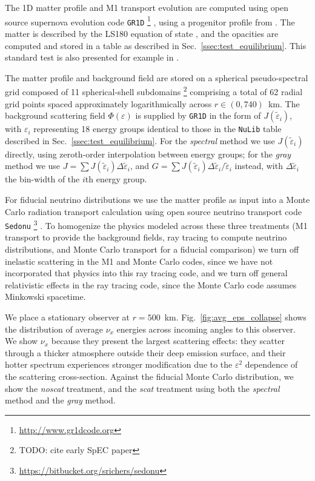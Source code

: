 \documentclass[aps,floatfix,prd,superscriptaddress,twocolumn]{revtex4-1}
\begin{document}
The 1D matter profile and M1 transport evolution are computed using
open source supernova evolution code \lstinline{GR1D}
\footnote{\url{http://www.gr1dcode.org}}
\cite{ocon2010-gr1d, ocon2015-gr1d_with_nu},
using a progenitor profile from \cite{woos1995-sn_progenitors}.
The matter is described by the LS180 equation of state \cite{latt1991-nuc_eos},
and the opacities are computed and stored in a table
as described in Sec.~\ref{ssec:test_equilibrium}.
This standard test is also presented for example in
\cite{ocon2015-gr1d_with_nu,fouc2015-m1_nsbh,abdi2012-monte_carlo,
}.

The matter profile and background field are stored on a spherical
pseudo-spectral grid composed of 11 spherical-shell subdomains
\footnote{TODO: cite early SpEC paper}
comprising a total of 62 radial grid points spaced approximately
logarithmically across $r\in(0,740)$~km.
The background scattering field $\Phi(\varepsilon)$ is supplied by
\lstinline{GR1D} in the form of $J(\tilde{\varepsilon}_i)$,
with $\varepsilon_i$ representing 18 energy groups
identical to those in the \lstinline{NuLib} table described in
Sec.~\ref{ssec:test_equilibrium}.
For the \emph{spectral} method we use $J(\tilde{\varepsilon}_i)$ directly,
using zeroth-order interpolation between energy groups;
for the \emph{gray} method we use $J=\sum J(\tilde{\varepsilon}_i) \Delta\tilde{\varepsilon}_i$,
and $G=\sum J(\tilde{\varepsilon}_i) \Delta\tilde{\varepsilon}_i/\tilde{\varepsilon}_i$ instead,
with $\Delta\tilde{\varepsilon}_i$ the bin-width of the $i$th energy group.

For fiducial neutrino distributions we use the matter profile
as input into a Monte Carlo radiation transport calculation using
open source neutrino transport code \lstinline{Sedonu}
\footnote{\url{https://bitbucket.org/srichers/sedonu}}
\cite{rich2015-monte_carlo}.
To homogenize the physics modeled across these three treatments
(M1 transport to provide the background fields,
ray tracing to compute neutrino distributions, and
Monte Carlo transport for a fiducial comparison)
we turn off inelastic scattering in the M1 and Monte Carlo codes,
since we have not incorporated that physics into this ray tracing code,
and we turn off general relativistic effects in the ray tracing code,
since the Monte Carlo code assumes Minkowski spacetime.

We place a stationary observer at $r=500$~km.
Fig.~\ref{fig:avg_eps_collapse} shows the distribution of average $\nu_x$
energies across incoming angles to this observer.
We show $\nu_x$ because they present the largest scattering effects:
they scatter through a thicker atmosphere outside their deep emission surface,
and their hotter spectrum experiences stronger modification due to the
$\varepsilon^2$ dependence of the scattering cross-section.
Against the fiducial Monte Carlo distribution, we show the
\emph{noscat} treatment, and the \emph{scat} treatment using both the
\emph{spectral} method and the \emph{gray} method.
\end{document}
